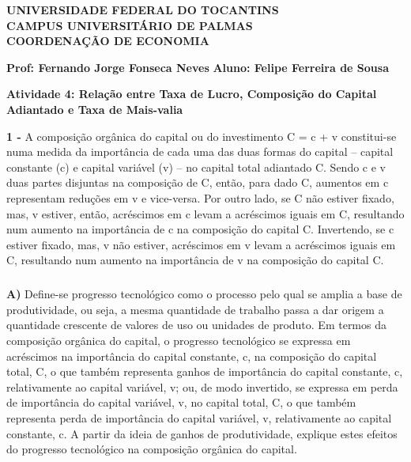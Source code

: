 \documentclass[a4paper, 12pt]{article} %
\begin{document}
\begin{center}
\textbf{UNIVERSIDADE FEDERAL DO TOCANTINS\\
	CAMPUS UNIVERSITÁRIO DE PALMAS\\
	COORDENAÇÃO DE ECONOMIA}
\end{center}

\textbf{Prof: Fernando Jorge Fonseca Neves }
\singlespacing
\textbf{Aluno: Felipe Ferreira de Sousa}
\begin{center}
\textbf{Atividade 4: Relação entre Taxa de Lucro, Composição do Capital Adiantado e Taxa de Mais-valia}
\end{center}
\vspace{0.5cm}

\vspace{0.5cm}

\par \textbf{1 -} A composição orgânica do capital ou do investimento C = c + v constitui-se numa medida da importância de cada uma das duas formas do capital – capital constante (c) e capital variável (v) – no capital total adiantado C. Sendo c e v duas partes disjuntas na composição de C, então, para dado C, aumentos em c representam reduções em v e vice-versa. Por outro lado, se C não estiver fixado, mas, v estiver, então, acréscimos em c levam a acréscimos iguais em C, resultando num aumento na importância de c na composição do capital C. Invertendo, se c estiver fixado, mas, v não estiver, acréscimos em v levam a acréscimos iguais em C, resultando num aumento na importância de v na composição do capital C. 

\subparagraph{} \textbf{A)}  Define-se progresso tecnológico como o processo pelo qual se amplia a base de
produtividade, ou seja, a mesma quantidade de trabalho passa a dar origem a quantidade
crescente de valores de uso ou unidades de produto. Em termos da composição orgânica
do capital, o progresso tecnológico se expressa em acréscimos na importância do capital
constante, c, na composição do capital total, C, o que também representa ganhos de
importância do capital constante, c, relativamente ao capital variável, v; ou, de modo
invertido, se expressa em perda de importância do capital variável, v, no capital total, C, o
que também representa perda de importância do capital variável, v, relativamente ao
capital constante, c. A partir da ideia de ganhos de produtividade, explique estes efeitos do
progresso tecnológico na composição orgânica do capital.

\vspace{0.5cm}
\end{document}
